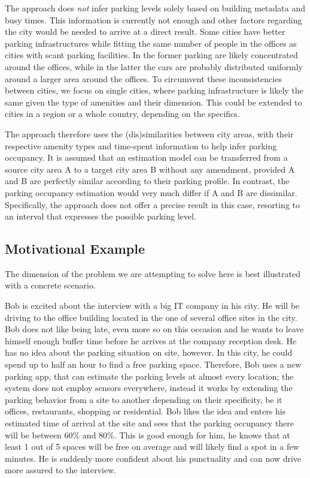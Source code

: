 	The approach does \textit{not} infer parking levels solely based on building metadata and busy times. This information is currently not enough and other factors regarding the city would be needed to arrive at a direct result. Some cities have better parking infrastructures while fitting the same number of people in the offices as cities with scant parking facilities. In the former parking are likely concentrated around the offices, while in the latter the cars are probably distributed uniformly around a larger area around the offices. To circumvent these inconsistencies between cities, we focus on single cities, where parking infrastructure is likely the same given the type of amenities and their dimension. This could be extended to cities in a region or a whole country, depending on the specifics.
	
	The approach therefore uses the (dis)similarities between city areas, with their respective amenity types and time-spent information to help infer parking occupancy. It is assumed that an estimation model can be transferred from a source city area A to a target city area B without any amendment, provided A and B are perfectly similar according to their parking profile. In contrast, the parking occupancy estimation would very much differ if A and B are dissimilar. Specifically, the approach does not offer a precise result in this case, resorting to an interval that expresses the possible parking level.
	
	\subsection{Motivational Example}
	The dimension of the problem we are attempting to solve here is best illustrated with a concrete scenario.
	
	Bob is excited about the interview with a big IT company in his city. He will be driving to the office building located in the one of several office sites in the city. Bob does not like being late, even more so on this occasion and he wants to leave himself enough buffer time before he arrives at the company reception desk. He has no idea about the parking situation on site, however. In this city, he could spend up to half an hour to find a free parking space. Therefore, Bob uses a new parking app, that can estimate the parking levels at almost every location; the system does not employ sensors everywhere, instead it works by extending the parking behavior from a site to another depending on their specificity, be it offices, restaurants, shopping or residential. Bob likes the idea and enters his estimated time of arrival at the site and sees that the parking occupancy there will be between 60\% and 80\%. This is good enough for him, he knows that at least 1 out of 5 spaces will be free on average and will likely find a spot in a few minutes. He is suddenly more confident about his punctuality and can now drive more assured to the interview.
	
